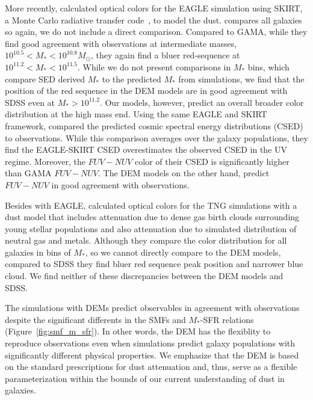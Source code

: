 More recently, \cite{trayford2017} calculated optical colors for the EAGLE simulation using
{\sc SKIRT}, a Monte Carlo radiative transfer code~\citep{camps2015}, to model the dust. 
\cite{trayford2017} compares all galaxies so again, we do not include a direct 
comparison. Compared to GAMA, while they find good agreement with observations 
at intermediate masses, $10^{10.5} < M_* < 10^{10.8} M_\odot$, they again find
a bluer red-sequence at $10^{11.2} < M_* < 10^{11.5}$. While we do not present
comparisons in $M_*$ bins, which compare SED derived $M_*$ to the predicted
$M_*$ from simulations, we find that the position of the red sequence in the
DEM models are in good agreement with SDSS even at $M_* > 10^{11.2}$. Our models, 
however, predict an overall broader color distribution at the high mass end. 
Using the same \cite{trayford2017} EAGLE and {\sc SKIRT} framework,
\cite{baes2019} compared the predicted cosmic spectral energy distributions
(CSED) to observations. While this comparison averages over the galaxy
populations, they find the EAGLE-{\sc SKIRT} CSED overestimates the observed
CSED in the UV regime. Moreover, the $FUV-NUV$ color of their CSED is
significantly higher than GAMA $FUV-NUV$. The DEM models on the other hand, 
predict $FUV-NUV$ in good agreement with observations. 

Besides with EAGLE, \cite{nelson2018} calculated optical colors for the
TNG simulations with a dust model that includes attenuation due to dense gas 
birth clouds surrounding young stellar populations and also attenuation due to 
simulated distribution of neutral gas and metals.
Although they compare the color distribution for all galaxies in bins of $M_*$,
so we cannot directly compare to the DEM models, compared to SDSS they find 
bluer red sequence peak position and narrower blue cloud. We find neither of
these discrepancies between the DEM models and SDSS. 

The simulations with DEMs predict observables in agreement with observations 
despite the significant differents in the SMFs and $M_*$-SFR relations 
(Figure~\ref{fig:smf_m_sfr}). In other words, the DEM has the 
flexiblity to reproduce observations even when simulations predict galaxy
populations with significantly different physical properties. We emphasize that
the DEM is based on the standard prescriptions for dust attenuation and, thus,
serve as a flexible parameterization within the bounds of our current
understanding of dust in galaxies.

